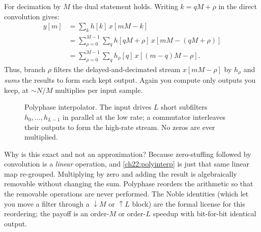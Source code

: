 For decimation by $M$ the dual statement holds. Writing $k = qM + \rho$ in the direct convolution gives:
\begin{align*}
  y[m] &= \sum_k h[k]\,x[m M - k] \\
  &= \sum_{\rho=0}^{M-1} \sum_q h[q M + \rho]\,x[m M - (q M + \rho)] \\
  &= \sum_{\rho=0}^{M-1} \sum_q h_\rho[q]\,x[(m - q)M - \rho].
\end{align*}
Thus, branch $\rho$ filters the delayed-and-decimated stream $x[m M - \rho]$ by $h_\rho$ and \emph{sums} the results to form each kept
output. Again you compute only outputs you keep, at $\sim N/M$ multiplies per
input sample.

\begin{figure}[htbp]
\centering
{}
\caption{Polyphase interpolator. The input drives $L$ short subfilters
$h_0,\dots,h_{L-1}$ in parallel at the low rate; a commutator interleaves their
outputs to form the high-rate stream. No zeros are ever multiplied.}
\label{ch22:fig-polyphase}
\end{figure}

\begin{whybox}
Why is this exact and not an approximation? Because zero-stuffing followed by
convolution is a \emph{linear} operation, and \eqref{ch22:polyinterp} is just
that same linear map re-grouped. Multiplying by zero and adding the result is
algebraically removable without changing the sum. Polyphase reorders the
arithmetic so that the removable operations are never performed. The Noble
identities (which let you move a filter through a $\downarrow M$ or $\uparrow L$
block) are the formal license for this reordering; the payoff is an order-$M$ or
order-$L$ speedup with bit-for-bit identical output.
\end{whybox}

